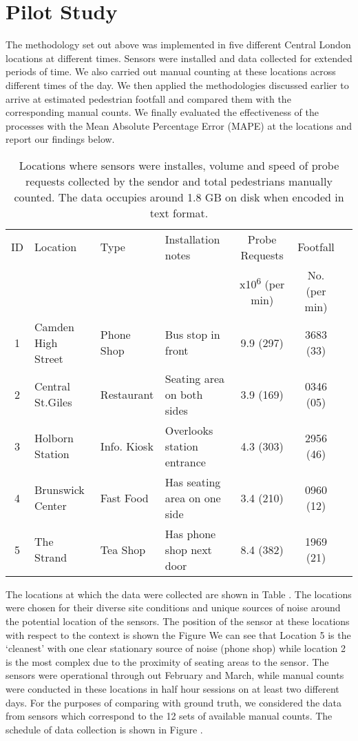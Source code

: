 \section{Pilot Study}

The methodology set out above was implemented in five different Central London locations at different times.
Sensors were installed and data collected for extended periods of time.
We also carried out manual counting at these locations across different times of the day.
We then applied the methodologies discussed earlier to arrive at estimated pedestrian footfall and compared them with the corresponding manual counts.
We finally evaluated the effectiveness of the processes with the Mean Absolute Percentage Error (MAPE) at the locations and report our findings below.

\begin{table}
    \caption{Locations where sensors were installes, volume and speed of probe requests collected by
    the sendor and total pedestrians manually counted. The data occupies around 1.8 GB on disk 
    when encoded in text format.}
        {\begin{tabular}{clllccc} 
         ID & Location & Type & Installation notes & Probe Requests & Footfall\\
         & & & & x10\textsuperscript{6} (per min) & No. (per min)\\
         1 & Camden High Street & Phone Shop & Bus stop in front & 9.9 (297) & 3683 (33)\\
         2 & Central St.Giles & Restaurant & Seating area on both sides & 3.9 (169) & 0346 (05)\\
         3 & Holborn Station & Info. Kiosk & Overlooks station entrance & 4.3 (303) & 2956 (46)\\
         4 & Brunswick Center & Fast Food & Has seating area on one side & 3.4 (210) & 0960 (12)\\
         5 & The Strand & Tea Shop & Has phone shop next door & 8.4 (382) & 1969 (21)\\
        \end{tabular}}
        \label{locations-table}
\end{table}

The locations at which the data were collected are shown in Table .
The locations were chosen for their diverse site conditions and unique sources of noise around the potential location of the sensors.
The position of the sensor at these locations with respect to the context is shown the Figure 
We can see that Location 5 is the `cleanest' with one clear stationary source of noise (phone shop) while location 2 is the most complex due to the proximity of seating areas to the sensor.
The sensors were operational through out February and March, while manual counts were conducted in these locations in half hour sessions on at least two different days.
For the purposes of comparing with ground truth, we considered the data from sensors which correspond to the 12 sets of available manual counts. The schedule of data collection is shown in Figure .


